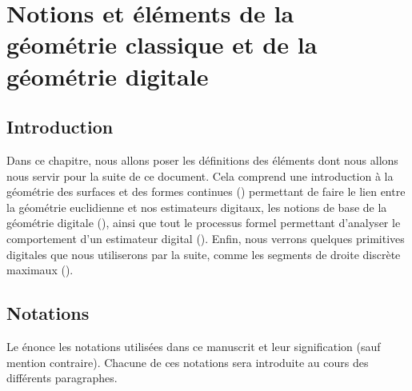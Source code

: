 %
\chapter{Notions et éléments de la géométrie classique et de la géométrie digitale}
\label{sec:notions}


\setcounter{minitocdepth}{3}
\minitoc

\newpage
%
\section{Introduction}
%
Dans ce chapitre, nous allons poser les définitions des éléments dont nous
allons nous servir pour la suite de ce document. Cela comprend une introduction à
la géométrie des surfaces et des formes continues () permettant
de faire le lien entre la géométrie euclidienne et nos estimateurs digitaux, les
notions de base de la géométrie digitale (), ainsi
que tout le processus formel permettant d'analyser le comportement d'un estimateur
digital (). Enfin, nous verrons
quelques primitives digitales que nous utiliserons par la suite, comme les
segments de droite discrète maximaux ().
%
\section{Notations}
%
Le  énonce les notations utilisées dans ce manuscrit et
leur signification (sauf mention contraire). Chacune de ces notations sera
introduite au cours des différents paragraphes.

